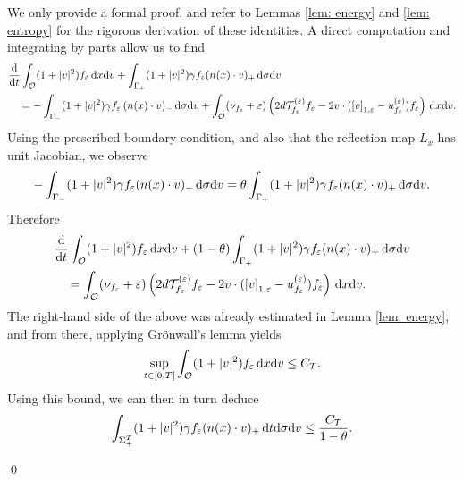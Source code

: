 \documentclass[10pt, reqno]{amsart}
\theoremstyle{plain}
\theoremstyle{definition}
\theoremstyle{remark}
\renewenvironment{proof}[1][\proofname]{\noindent{\scshape #1.\quad}}{\qed}
\numberwithin{equation}{section}
\newcommand{\calO}{\mathcal O}
\newcommand{\calT}{\mathcal T}
\newcommand{\ve}{\varepsilon}
\newcommand{\dx}{\textnormal{d}x}
\newcommand{\dv}{\textnormal{d}v}
\newcommand{\dt}{\textnormal{d}t}
\newcommand{\ddt}{\frac{\textnormal{d}}{\textnormal{d}t}}
\newcommand{\tnd}{\textnormal{d}}
\newcommand{\lt}{\left}
\newcommand{\rt}{\right}
\newcommand{\renorm}[3]{\lt[#1\rt]_{#2 , #3}}
\begin{document}
\begin{proof}
    We only provide a formal proof, and refer to Lemmas \ref{lem: energy} and \ref{lem: entropy} for the rigorous derivation of these identities. A direct computation and integrating by parts allow us to find
    \begin{align*}
        &\ddt \int_{\calO} (1+|v|^2) f_\ve \,\dx\dv + \int_{\Gamma_+} (1+|v|^2) \gamma f_\ve (n(x)\cdot v)_+ \,\tnd\sigma\dv \\
        &\quad = -\int_{\Gamma_-} (1+|v|^2) \gamma f_\ve \,(n(x)\cdot v)_- \,\tnd\sigma\dv + \int_{\calO} (\nu_{f_\ve} + \ve) \lt(2 d \calT_{f_\ve}^{(\ve)} f_\ve - 2v\cdot (\renorm{v}{1}{\ve} - u_{f_\ve}^{(\ve)}) f_\ve \rt) \,\dx\dv.
    \end{align*}
    Using the prescribed boundary condition, and also that the reflection map $L_x$ has unit Jacobian, we observe 
    \begin{align*}
        -\int_{\Gamma_-} (1+|v|^2) \gamma f_\ve (n(x)\cdot v)_- \,\tnd\sigma\dv = \theta \int_{\Gamma_+} (1+|v|^2)  \gamma f_\ve (n(x)\cdot v)_+ \,\tnd\sigma\dv.
    \end{align*}
    Therefore
    \begin{align*}
        &\ddt \int_{\calO} (1+|v|^2) f_\ve \,\dx\dv + (1-\theta) \int_{\Gamma_+} (1+|v|^2) \gamma f_\ve (n(x)\cdot v)_+ \,\tnd\sigma\dv \\
        &\quad = \int_{\calO} (\nu_{f_\ve} + \ve) \lt(2d \calT_{f_\ve}^{(\ve)} f_\ve - 2v\cdot (\renorm{v}{1}{\ve} - u_{f_\ve}^{(\ve)}) f_\ve \rt) \,\dx\dv.
    \end{align*}
    The right-hand side of the above was already estimated in Lemma \ref{lem: energy}, and from there, applying Gr\"onwall's lemma yields
    \begin{equation}\label{spec: eq: energy}
        \sup_{t\in [0,T]} \int_{\calO} (1+|v|^2) f_\ve \,\dx\dv \le C_T.
    \end{equation}
    Using this bound, we can then in turn deduce
    \begin{align*}
        \int_{\Sigma_+^T} (1+|v|^2) \gamma f_\ve (n(x)\cdot v)_+ \,\dt\tnd\sigma\dv \le \frac{C_T}{1-\theta}.
    \end{align*}


\end{proof}
\end{document}
